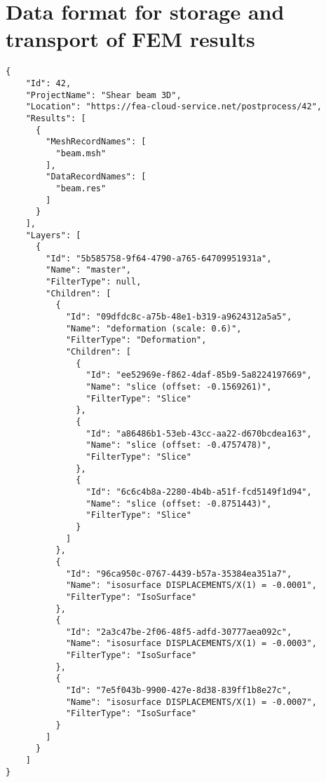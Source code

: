\chapter{Data format for storage and transport of FEM results}
\label{appendix:data-format}


\begin{lstlisting}[style=json,caption=Example of solution.json document,label=lst:solution.json]
{
    "Id": 42,
    "ProjectName": "Shear beam 3D",
    "Location": "https://fea-cloud-service.net/postprocess/42",
    "Results": [
      {
        "MeshRecordNames": [
          "beam.msh"
        ],
        "DataRecordNames": [
          "beam.res"
        ]
      }
    ],
    "Layers": [
      {
        "Id": "5b585758-9f64-4790-a765-64709951931a",
        "Name": "master",
        "FilterType": null,
        "Children": [
          {
            "Id": "09dfdc8c-a75b-48e1-b319-a9624312a5a5",
            "Name": "deformation (scale: 0.6)",
            "FilterType": "Deformation",
            "Children": [
              {
                "Id": "ee52969e-f862-4daf-85b9-5a8224197669",
                "Name": "slice (offset: -0.1569261)",
                "FilterType": "Slice"
              },
              {
                "Id": "a86486b1-53eb-43cc-aa22-d670bcdea163",
                "Name": "slice (offset: -0.4757478)",
                "FilterType": "Slice"
              },
              {
                "Id": "6c6c4b8a-2280-4b4b-a51f-fcd5149f1d94",
                "Name": "slice (offset: -0.8751443)",
                "FilterType": "Slice"
              }
            ]
          },
          {
            "Id": "96ca950c-0767-4439-b57a-35384ea351a7",
            "Name": "isosurface DISPLACEMENTS/X(1) = -0.0001",
            "FilterType": "IsoSurface"
          },
          {
            "Id": "2a3c47be-2f06-48f5-adfd-30777aea092c",
            "Name": "isosurface DISPLACEMENTS/X(1) = -0.0003",
            "FilterType": "IsoSurface"
          },
          {
            "Id": "7e5f043b-9900-427e-8d38-839ff1b8e27c",
            "Name": "isosurface DISPLACEMENTS/X(1) = -0.0007",
            "FilterType": "IsoSurface"
          }
        ]
      }
    ]
}
\end{lstlisting}

\pagebreak

